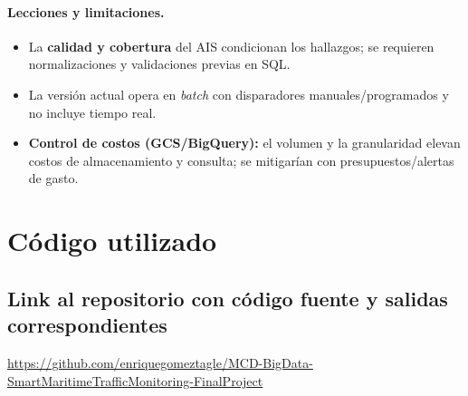 \documentclass[10pt]{article}
\begin{document}
\paragraph{Lecciones y limitaciones.}
\begin{itemize}
  \item La \textbf{calidad y cobertura} del AIS condicionan los hallazgos; se requieren normalizaciones y validaciones previas en SQL.
  \item La versión actual opera en \textit{batch} con disparadores manuales/programados y no incluye tiempo real.
  \item \textbf{Control de costos (GCS/BigQuery):} el volumen y la granularidad elevan costos de almacenamiento y consulta; se mitigarían con presupuestos/alertas de gasto.
\end{itemize}


\section{Código utilizado} 
\subsection{Link al repositorio con código fuente y salidas correspondientes}
\url{https://github.com/enriquegomeztagle/MCD-BigData-SmartMaritimeTrafficMonitoring-FinalProject}
\end{document}
